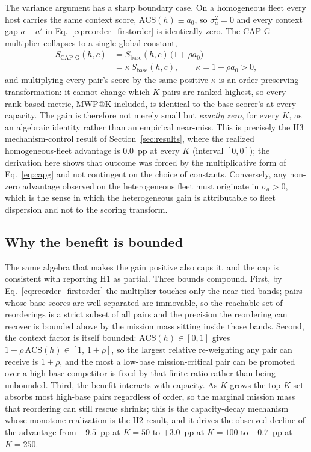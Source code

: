 The variance argument has a sharp boundary case. On a homogeneous fleet every
host carries the same context score, $\mathrm{ACS}(h)\equiv a_0$, so
$\sigma_a^2=0$ and every context gap $a-a'$ in
Eq.~\ref{eq:reorder_firstorder} is identically zero. The CAP-G multiplier
collapses to a single global constant,
%
\begin{equation}
\label{eq:homogeneous}
\begin{split}
S_{\mathrm{CAP\text{-}G}}(h,c) &= S_{\mathrm{base}}(h,c)\,\bigl(1+\rho a_0\bigr) \\
&= \kappa\,S_{\mathrm{base}}(h,c),\qquad \kappa=1+\rho a_0>0,
\end{split}
\end{equation}
%
and multiplying every pair's score by the same positive $\kappa$ is an
order-preserving transformation: it cannot change which $K$ pairs are ranked
highest, so every rank-based metric, MWP@K included, is identical to the base
scorer's at every capacity. The gain is therefore not merely small but
\emph{exactly zero}, for every $K$, as an algebraic identity rather than an
empirical near-miss. This is precisely the H3 mechanism-control result of
Section~\ref{sec:results}, where the realized homogeneous-fleet advantage is
$0.0$~pp at every $K$ (interval $[0,0]$); the derivation here shows that outcome
was forced by the multiplicative form of Eq.~\ref{eq:capg} and not contingent on
the choice of constants. Conversely, any non-zero advantage observed on the
heterogeneous fleet must originate in $\sigma_a>0$, which is the sense in which
the heterogeneous gain is attributable to fleet dispersion and not to the
scoring transform.

\subsection{Why the benefit is bounded}
\label{sec:theory_bounded}

The same algebra that makes the gain positive also caps it, and the cap is
consistent with reporting H1 as partial. Three bounds compound. First, by
Eq.~\ref{eq:reorder_firstorder} the multiplier touches only the near-tied bands;
pairs whose base scores are well separated are immovable, so the reachable set of
reorderings is a strict subset of all pairs and the precision the reordering can
recover is bounded above by the mission mass sitting inside those bands. Second,
the context factor is itself bounded: $\mathrm{ACS}(h)\in[0,1]$ gives
$1+\rho\,\mathrm{ACS}(h)\in[1,\,1+\rho]$, so the largest relative re-weighting any
pair can receive is $1+\rho$, and the most a low-base mission-critical pair can be
promoted over a high-base competitor is fixed by that finite ratio rather than
being unbounded. Third, the benefit interacts with capacity. As $K$ grows the
top-$K$ set absorbs most high-base pairs regardless of order, so the marginal
mission mass that reordering can still rescue shrinks; this is the capacity-decay
mechanism whose monotone realization is the H2 result, and it drives the observed
decline of the advantage from $+9.5$~pp at $K=50$ to $+3.0$~pp at $K=100$ to
$+0.7$~pp at $K=250$.

